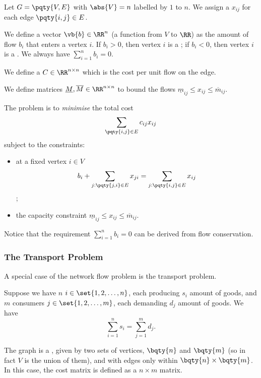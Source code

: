 \begin{definition}
    Let \(G = \pqty{V, E}\) with \(\abs{V} = n\) labelled by \(1\) to \(n\). We assign a  \(x_{ij}\) for each edge \(\pqty{i, j} \in E\).

    We define a vector \(\vb{b} \in \RR^n\) (a function from \(V\) to \(\RR\)) as the amount of flow \(b_i\) that enters a vertex \(i\). If \(b_i > 0\), then vertex \(i\) is a ; if \(b_i < 0\), then vertex \(i\) is a . We always have \(\sum_{i = 1}^{n} b_i = 0\).

    We define a  \(C \in \RR^{n \times n}\) which is the cost per unit flow on the edge.

    We define matrices \(\underline{M}, \overline{M} \in \RR^{n \times n}\) to bound the flows \(\underline{m}_{ij} \leq x_{ij} \leq \overline{m}_{ij}\).
\end{definition}

\begin{definition}
    The  problem is to \emph{minimise} the total cost
    \[
        \sum_{\pqty{i, j} \in E} c_{ij} x_{ij}
    \]
    subject to the constraints:
    \begin{itemize}
        \item {} at a fixed vertex \(i \in V\)
        \[
            b_i + \sum_{j: \pqty{j, i} \in E} x_{ji} = \sum_{j: \pqty{i, j} \in E} x_{ij}
        \];
        \item the capacity constraint \(\underline{m}_{ij} \leq x_{ij} \leq \overline{m}_{ij}\).
    \end{itemize}
\end{definition}

Notice that the requirement \(\sum_{i = 1}^{n} b_i = 0\) can be derived from flow conservation.

\subsubsection{The Transport Problem}

A special case of the network flow problem is the transport problem.

\begin{definition}
    Suppose we have \(n\)  \(i \in \set{1, 2, \ldots, n}\), each producing \(s_i\) amount of goods, and \(m\) consumers  \(j \in \set{1, 2, \ldots, m}\), each demanding \(d_j\) amount of goods. We have
    \[
        \sum_{i = 1}^{n} s_i = \sum_{j = 1}^{m} d_j.
    \]

    The graph is a , given by two sets of vertices, \(\bqty{n}\) and \(\bqty{m}\) (so in fact \(V\) is the  union of them), and with edges only within \(\bqty{n} \times \bqty{m}\). In this case, the cost matrix is defined as a \(n \times m\) matrix.
\end{definition}

